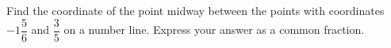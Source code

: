 Find the coordinate of the point midway between the points with coordinates $-1\dfrac{5}{6}$ and $\dfrac{3}{5}$ on a number line. Express your answer as a common fraction.

